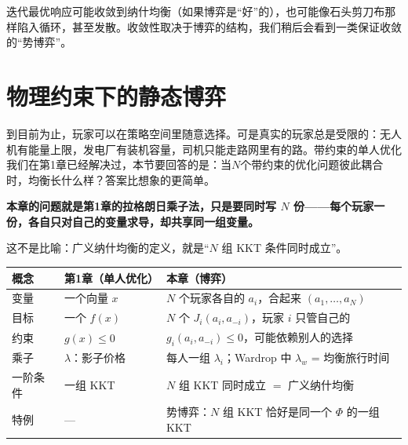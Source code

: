 \begin{warning}[title=迭代最优响应不一定收敛]
迭代最优响应可能收敛到纳什均衡（如果博弈是“好”的），也可能像石头剪刀布那样陷入循环，甚至发散。收敛性取决于博弈的结构，我们稍后会看到一类保证收敛的“势博弈”。
\end{warning}

\section{物理约束下的静态博弈}

到目前为止，玩家可以在策略空间里随意选择。可是真实的玩家总是受限的：无人机有能量上限，发电厂有装机容量，司机只能走路网里有的路。带约束的单人优化我们在第1章已经解决过，本节要回答的是：当$N$个带约束的优化问题彼此耦合时，均衡长什么样？答案比想象的更简单。

\begin{tcolorbox}[colback=yellow!10, colframe=orange!80, title=本章的核心观点]
\textbf{本章的问题就是第1章的拉格朗日乘子法，只是要同时写 $N$ 份——每个玩家一份，各自只对自己的变量求导，却共享同一组变量。}

这不是比喻：广义纳什均衡的定义，就是“$N$ 组 KKT 条件同时成立”。

\begin{center}
\renewcommand{\arraystretch}{1.3}
\small
\begin{tabularx}{\linewidth}{lXX}
\toprule
\textbf{概念} & \textbf{第1章（单人优化）} & \textbf{本章（博弈）} \\
\midrule
变量 & 一个向量 $x$ & $N$ 个玩家各自的 $a_i$，合起来 $(a_1, \ldots, a_N)$ \\
目标 & 一个 $f(x)$ & $N$ 个 $J_i(a_i, a_{-i})$，玩家 $i$ 只管自己的 \\
约束 & $g(x) \le 0$ & $g_i(a_i, a_{-i}) \le 0$，可能依赖别人的选择 \\
乘子 & $\lambda$：影子价格 & 每人一组 $\lambda_i$；Wardrop 中 $\lambda_w$ = 均衡旅行时间 \\
一阶条件 & 一组 KKT & $N$ 组 KKT 同时成立 $=$ 广义纳什均衡 \\
特例 & --- & 势博弈：$N$ 组 KKT 恰好是同一个 $\Phi$ 的一组 KKT \\
\bottomrule
\end{tabularx}
\end{center}
\end{tcolorbox}

